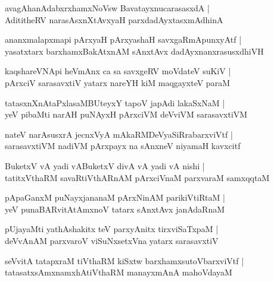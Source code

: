 \begin{shloka}
avagAhanAdabxrxhamxNoVsw BavatayxnucarasasxdA |\\
AdititheRV narasAsxnXtAvxyaH parxdadAyxtasxmAdhinA
\end{shloka}

\begin{shloka}
ananxmalapxmapi pArxyaH pArxyashaH savxgaRmApunxyAtf |\\
yasatxtarx barxhamxBakAtxnAM sAnxtAvx dadAyxnanxrasusxdhiVH
\end{shloka}

\begin{shloka}
kaqshareVNApi heVmAnx ca sa savxgeRV moVdateV suKiV |\\
pArxciV sarasavxtiV yatarx nareYH kiM maqgayxteV paraM
\end{shloka}

\begin{shloka}
tatasxnXnAtaPxlasaMBUteyxY tapoV japAdi lakaSxNaM |\\
yeV pibaMti narAH puNAyxH pArxciVM deVviVM sarasavxtiVM
\end{shloka}

\begin{shloka}
nateV narAsusxrA jecnxVyA mAkaRMDeVyaSiRrabarxviVtf |\\
sarasavxtiVM nadiVM pArxpayx na sAnxneV niyamaH kavxcitf
\end{shloka}

\begin{shloka}
BuketxV vA yadi vABuketxV divA vA yadi vA nishi |\\
tatitxVthaRM savaRtiVthARnAM pArxciVnaM parxvaraM samxqqtaM 
\end{shloka}

\begin{shloka}
pApaGanxM puNayxjananaM pArxNinAM parikiVtiRtaM |\\
yeV punaBARvitAtAmxnoV tatarx sAnxtAvx janAdaRnaM 
\end{shloka}

\begin{shloka}
pUjayaMti yathAshakitx teV parxyAnitx tirxviSaTxpaM |\\
deVvAnAM parxvaroV viSuNxsetxVna yatarx sarasavxtiV 
\end{shloka}

\begin{shloka}
seVvitA tatapxraM tiVthaRM kiSxtw barxhamxsutoVbarxviVtf |\\
tatasatxsAmxnamxhAtiVthaRM manayxmAnA mahoVdayaM 
\end{shloka}

